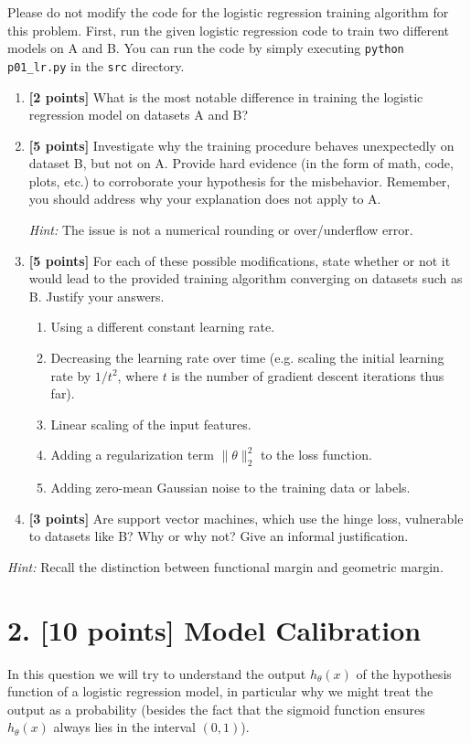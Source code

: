 \documentclass[11pt]{article}
\newcommand{\problem}[2]{\clearpage\section*{#1. #2}}
\newcommand{\code}[1]{\nolinkurl{#1}}
\begin{document}
Please do not modify the code for the logistic regression training algorithm for this problem. First, run the given logistic regression code to train two different models on A and B. You can run the code by simply executing \code{python p01_lr.py} in the \code{src} directory.
\begin{enumerate}
\item \textbf{[2 points]} What is the most notable difference in training the logistic regression model on datasets A and B?
\item \textbf{[5 points]} Investigate why the training procedure behaves unexpectedly on dataset B, but not on A. Provide hard evidence (in the form of math, code, plots, etc.) to corroborate your hypothesis for the misbehavior. Remember, you should address why your explanation does not apply to A.

\textit{Hint:} The issue is not a numerical rounding or over/underflow error.
\item \textbf{[5 points]} For each of these possible modifications, state whether or not it would lead to the provided training algorithm converging on datasets such as B. Justify your answers.
\begin{enumerate}
\item Using a different constant learning rate.
\item Decreasing the learning rate over time (e.g. scaling the initial learning rate by $1/t^2$, where $t$ is the number of gradient descent iterations thus far).
\item Linear scaling of the input features.
\item Adding a regularization term $\|\theta\|_2^2$ to the loss function.
\item Adding zero-mean Gaussian noise to the training data or labels.
\end{enumerate}
\item \textbf{[3 points]} Are support vector machines, which use the hinge loss, vulnerable to datasets like B? Why or why not? Give an informal justification.
\end{enumerate}
\textit{Hint:} Recall the distinction between functional margin and geometric margin.

\problem{2}{[10 points] Model Calibration}
In this question we will try to understand the output $h_\theta(x)$ of the hypothesis function of a logistic regression model, in particular why we might treat the output as a probability (besides the fact that the sigmoid function ensures $h_\theta(x)$ always lies in the interval $(0,1)$).
\end{document}
